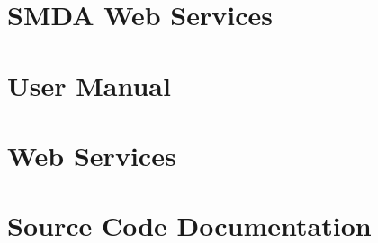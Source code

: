 \appendix


\chapter{SMDA Web Services}
\label{ch:maw_web_services}



\chapter{\keggapp User Manual}
\label{ch:kegg_manual}



\chapter{\boldpathcasekegg Web Services}
\label{ch:kegg_web_services}


\chapter{\keggapp Source Code Documentation}
\label{ch:kegg_code_docs}
\singlespace

\doublespace


\singlespace
%
\doublespace







